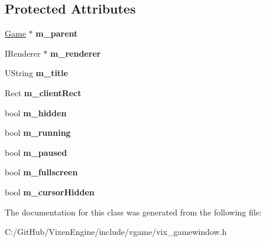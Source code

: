 \subsection*{Protected Attributes}
\begin{DoxyCompactItemize}
\item 
\hypertarget{class_vixen_1_1_game_window_a63f77c074588dcd65b0f001fea967ea6}{}\hyperlink{class_vixen_1_1_game}{Game} $\ast$ {\bfseries m\+\_\+parent}\label{class_vixen_1_1_game_window_a63f77c074588dcd65b0f001fea967ea6}

\item 
\hypertarget{class_vixen_1_1_game_window_ae913d8c294a307b35b71742bd41f8517}{}I\+Renderer $\ast$ {\bfseries m\+\_\+renderer}\label{class_vixen_1_1_game_window_ae913d8c294a307b35b71742bd41f8517}

\item 
\hypertarget{class_vixen_1_1_game_window_a7377edb75bda474cf7d55c7d9f177ab5}{}U\+String {\bfseries m\+\_\+title}\label{class_vixen_1_1_game_window_a7377edb75bda474cf7d55c7d9f177ab5}

\item 
\hypertarget{class_vixen_1_1_game_window_a6444934a5121d8f61aa8d9d756e63f5c}{}Rect {\bfseries m\+\_\+client\+Rect}\label{class_vixen_1_1_game_window_a6444934a5121d8f61aa8d9d756e63f5c}

\item 
\hypertarget{class_vixen_1_1_game_window_a9995d046c92e69e824469bc390fb3e9b}{}bool {\bfseries m\+\_\+hidden}\label{class_vixen_1_1_game_window_a9995d046c92e69e824469bc390fb3e9b}

\item 
\hypertarget{class_vixen_1_1_game_window_a737f05e2aa94c71588d21ea026f9b655}{}bool {\bfseries m\+\_\+running}\label{class_vixen_1_1_game_window_a737f05e2aa94c71588d21ea026f9b655}

\item 
\hypertarget{class_vixen_1_1_game_window_a1f47fd8d977df49edfb4f953f1f7afa8}{}bool {\bfseries m\+\_\+paused}\label{class_vixen_1_1_game_window_a1f47fd8d977df49edfb4f953f1f7afa8}

\item 
\hypertarget{class_vixen_1_1_game_window_a01e64b59a5b7d1c9e644288bc896035c}{}bool {\bfseries m\+\_\+fullscreen}\label{class_vixen_1_1_game_window_a01e64b59a5b7d1c9e644288bc896035c}

\item 
\hypertarget{class_vixen_1_1_game_window_a5b3ec9d4d07706f76bdb9e5f4e5ea3e4}{}bool {\bfseries m\+\_\+cursor\+Hidden}\label{class_vixen_1_1_game_window_a5b3ec9d4d07706f76bdb9e5f4e5ea3e4}

\end{DoxyCompactItemize}


The documentation for this class was generated from the following file\+:\begin{DoxyCompactItemize}
\item 
C\+:/\+Git\+Hub/\+Vixen\+Engine/include/vgame/vix\+\_\+gamewindow.\+h\end{DoxyCompactItemize}
